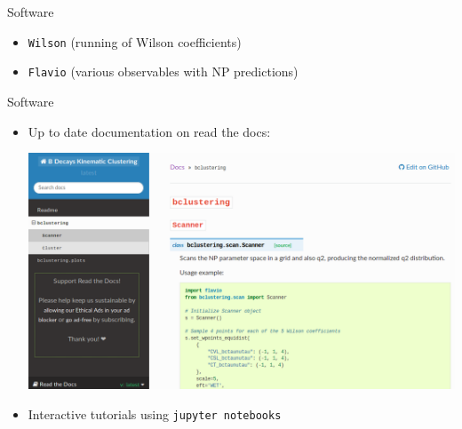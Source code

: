 \begin{frame}{Software}
\begin{itemize}
		\item {} \texttt{Wilson} {\footnotesize(running of Wilson coefficients)}
		\item {} \texttt{Flavio} {\footnotesize(various observables with NP predictions)}
	\end{itemize}
\end{frame}

\begin{frame}{Software}
	\begin{itemize}
		\item Up to date documentation on read the docs:\\[3ex]
		\begin{center}\includegraphics[width=0.8\linewidth]{figures/scrot/readthedocs.png}\end{center}
		\vspace{2ex}
		\item Interactive tutorials using  \texttt{jupyter notebooks}
	\end{itemize}
	
	\bigskip
	
\end{frame}

